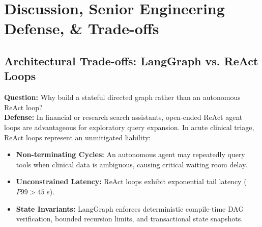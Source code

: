 \documentclass[11pt,a4paper]{article}
\begin{document}
\section{Discussion, Senior Engineering Defense, \& Trade-offs}

\subsection{Architectural Trade-offs: LangGraph vs. ReAct Loops}
\textbf{Question:} Why build a stateful directed graph rather than an autonomous ReAct loop?\\
\textbf{Defense:} In financial or research search assistants, open-ended ReAct agent loops are advantageous for exploratory query expansion. In acute clinical triage, ReAct loops represent an unmitigated liability:
\begin{itemize}[leftmargin=1.5em]
    \item \textbf{Non-terminating Cycles:} An autonomous agent may repeatedly query tools when clinical data is ambiguous, causing critical waiting room delay.
    \item \textbf{Unconstrained Latency:} ReAct loops exhibit exponential tail latency ($P99 > 45$ s).
    \item \textbf{State Invariants:} LangGraph enforces deterministic compile-time DAG verification, bounded recursion limits, and transactional state snapshots.
\end{itemize}
\end{document}

